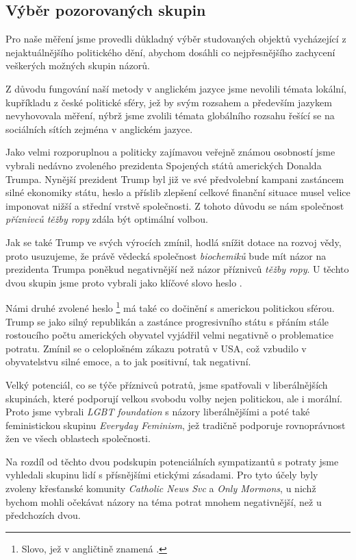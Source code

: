 \documentclass[12pt, a4paper]{article}
\numberwithin{equation}{section} 	%
\begin{document}
\subsection{Výběr pozorovaných skupin}
\noindent Pro naše měření jsme provedli důkladný výběr studovaných objektů vycházející z nejaktuálnějšího politického dění, abychom dosáhli co nejpřesnějšího zachycení veškerých možných skupin názorů.

Z důvodu fungování naší metody v anglickém jazyce jsme nevolili témata lokální, kupříkladu z české politické sféry, jež by svým rozsahem a především jazykem nevyhovovala měření, nýbrž jsme zvolili témata globálního rozsahu řešící se na sociálních sítích zejména v anglickém jazyce.

Jako velmi rozporuplnou a politicky zajímavou veřejně známou osobností jsme vybrali nedávno zvoleného prezidenta Spojených států amerických Donalda Trumpa. Nynější prezident Trump byl již ve své předvolební kampani zastáncem silné ekonomiky státu, heslo  a příslib zlepšení celkové finanční situace musel velice imponovat nižší a střední vrstvě společnosti. Z tohoto důvodu se nám společnost \textit{příznivců těžby ropy} zdála být optimální volbou.

Jak se také Trump ve svých výrocích zmínil, hodlá snížit dotace na rozvoj vědy, proto usuzujeme, že právě vědecká společnost \textit{biochemiků} bude mít názor na prezidenta Trumpa poněkud negativnější než názor příznivců \textit{těžby ropy}. U těchto dvou skupin jsme proto vybrali jako klíčové slovo heslo \textit{}.

Námi druhé zvolené heslo \textit{}\footnote{Slovo, jež v angličtině znamená \textit{}.} má také co dočinění s americkou politickou sférou. Trump se jako silný republikán a zastánce progresivního státu s přáním stále rostoucího počtu amerických obyvatel vyjádřil velmi negativně o problematice potratu. Zmínil se o celoplošném zákazu potratů v USA, což vzbudilo v obyvatelstvu silné emoce, a to jak positivní, tak negativní.

Velký potenciál, co se týče příznivců potratů, jsme spatřovali v liberálnějších skupinách, které podporují velkou svobodu volby nejen politickou, ale i morální. Proto jsme vybrali \textit{LGBT foundation} s názory liberálnějšími a poté také feministickou skupinu \textit{Everyday Feminism}, jež tradičně podporuje rovnoprávnost žen ve všech oblastech společnosti.

Na rozdíl od těchto dvou podskupin potenciálních sympatizantů s potraty jsme vyhledali skupinu lidí s přísnějšími etickými zásadami. Pro tyto účely byly zvoleny křesťanské komunity \textit{Catholic News Svc} a \textit{Only Mormons}, u nichž bychom mohli očekávat názory na téma potrat mnohem negativnější, než u předchozích dvou.
\end{document}
